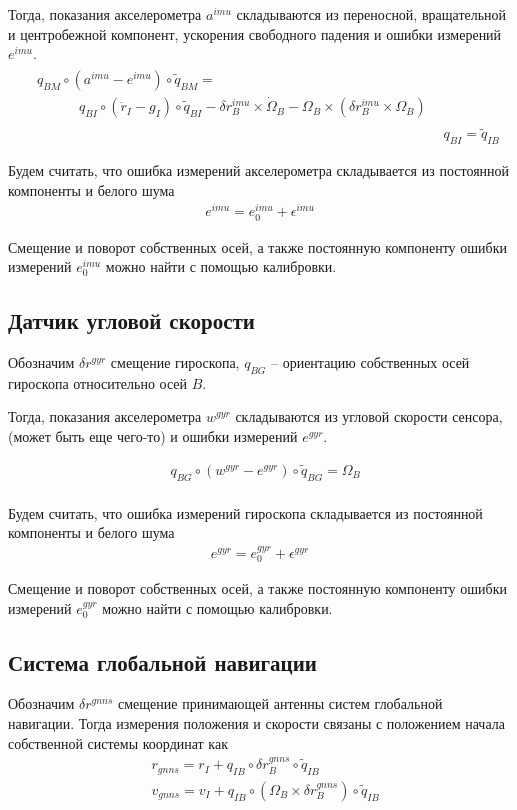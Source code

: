 \documentclass[a4paper,12pt]{article}
\begin{document}
Тогда, показания акселерометра $a^{imu}$ складываются из переносной, вращательной и центробежной компонент, ускорения свободного падения и ошибки измерений $e^{imu}$.
\begin{align} 
\begin{split} \label{eq:imu_mes}
&q_{BM} \circ (a^{imu} - e^{imu}) \circ \tilde{q}_{BM} = \\
&\quad \quad \quad {q}_{BI} \circ (\ddot{r}_{I} - g_I) \circ \tilde{q}_{BI}
 - {\delta r^{imu}_B}  \times \dot{\Omega}_B
 - \Omega_B \times (\delta r^{imu}_B \times \Omega_B)
\end{split}
\\
&q_{BI} = \tilde{q}_{IB}
\end{align}

Будем считать, что ошибка измерений акселерометра складывается из постоянной компоненты  и белого шума
\begin{align} 
e^{imu} = e_{0}^{imu} + \epsilon^{imu}
\end{align}

Смещение и поворот собственных осей, а также постоянную компоненту ошибки измерений $e_{0}^{imu}$ можно найти с помощью калибровки.

\subsection{Датчик угловой скорости}
Обозначим $\delta r^{\textit{gyr}}$ смещение гироскопа,  $q_{BG}$ -- ориентацию собственных осей гироскопа относительно осей $B$.

Тогда, показания акселерометра $w^{\textit{gyr}}$ складываются из угловой скорости сенсора, (может быть еще чего-то) и ошибки измерений $e^{\textit{gyr}}$.

\begin{align} 
&q_{BG} \circ (w^{\textit{gyr}} - e^{\textit{gyr}}) \circ \tilde{q}_{BG} = 
\Omega_B
\\
\end{align}

Будем считать, что ошибка измерений гироскопа складывается из постоянной компоненты  и белого шума
\begin{align} 
e^{\textit{gyr}} = e_{0}^{\textit{gyr}} + \epsilon^{\textit{gyr}}
\end{align}

Смещение и поворот собственных осей, а также постоянную компоненту ошибки измерений $e_{0}^{\textit{gyr}}$ можно найти с помощью калибровки.

\subsection{Система глобальной навигации}
Обозначим $\delta r^{gnns}$ смещение принимающей антенны систем глобальной навигации. Тогда измерения положения и скорости связаны с положением начала собственной системы координат как
\begin{align} 
&r_{gnns} = r_I + q_{IB} \circ \delta r^{gnns}_B \circ \tilde{q}_{IB} \\
&v_{gnns} = v_I + q_{IB} \circ  (\Omega_B \times \delta r^{gnns}_B) \circ \tilde{q}_{IB} \\
\end{align}
\end{document}
